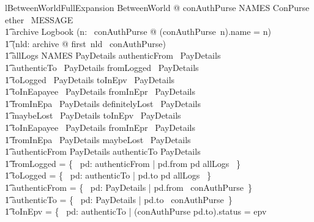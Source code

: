 \begin{LNewLemma}
\begin{theorem}{lBetweenWorldFullExpansion}
    \forall BetweenWorld @ conAuthPurse \in NAMES \finj ConPurse \land
            ether \in \power~MESSAGE \land \\ \t1
            archive \in Logbook \land  (\forall n: \dom~conAuthPurse @ (conAuthPurse~n).name = n) \land \\ \t1
            (\forall nld: archive @ first~nld \in \dom~conAuthPurse) \land \\
         \t1
            allLogs \in NAMES \rel PayDetails \land
            authenticFrom \in \power~PayDetails \land \\ \t1
            authenticTo \in \power~PayDetails \land
            fromLogged \in \power~PayDetails \land \\ \t1
            toLogged \in \power~PayDetails \land
            toInEpv \in \power~PayDetails \land \\ \t1
            toInEapayee \in \power~PayDetails \land
            fromInEpr \in \power~PayDetails \land \\ \t1
            fromInEpa \in \power~PayDetails \land
            definitelyLost \in \power~PayDetails \land \\ \t1
            maybeLost \in \power~PayDetails \land
            toInEpv \in \finset~PayDetails \land \\ \t1
            toInEapayee \in \finset~PayDetails \land
            fromInEpr \in \finset~PayDetails \land \\ \t1
            fromInEpa \in \finset~PayDetails \land
            maybeLost \in \finset~PayDetails \land \\ \t1
            authenticFrom \in \finset PayDetails \land
            authenticTo \in \finset PayDetails \land \\ \t1
            fromLogged = \{~ pd: authenticFrom | pd.from \mapsto pd \in allLogs ~\} \land \\ \t1
            toLogged = \{~ pd: authenticTo | pd.to \mapsto pd \in allLogs ~\} \land \\ \t1
            authenticFrom = \{~ pd: PayDetails | pd.from \in \dom~conAuthPurse~\} \land \\ \t1
            authenticTo = \{~ pd: PayDetails | pd.to \in \dom~conAuthPurse~\} \land \\ \t1
            toInEpv = \{~ pd: authenticTo | (conAuthPurse pd.to).status = epv \\

\end{theorem}
\end{LNewLemma}
